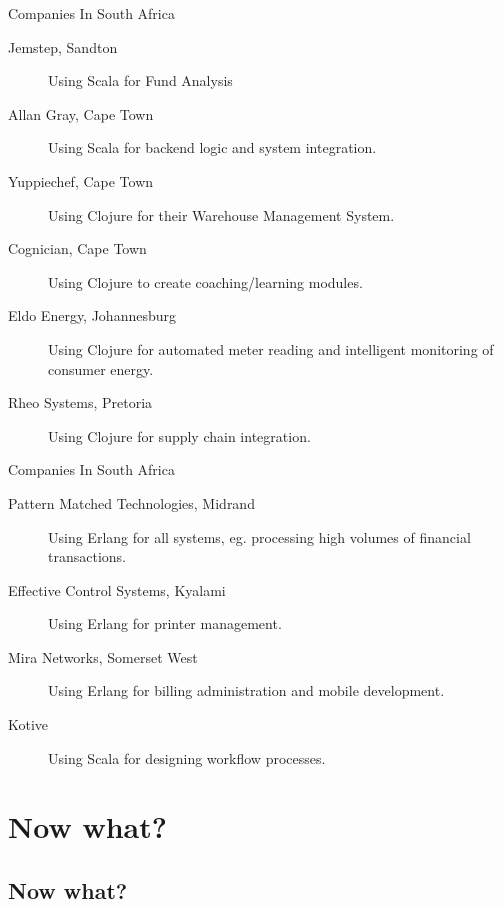 \documentclass[mathserif]{beamer}
\begin{document}
\begin{frame}{Companies In South Africa}

  \begin{description}
  \item[Jemstep, Sandton] Using Scala for Fund Analysis
  \item[Allan Gray, Cape Town] Using Scala for backend logic and system integration.
  \item[Yuppiechef, Cape Town] Using Clojure for their Warehouse
    Management System.
  \item[Cognician, Cape Town] Using Clojure to create coaching/learning modules.
  \item[Eldo Energy, Johannesburg] Using Clojure for automated meter
    reading and intelligent monitoring of consumer energy.
  \item[Rheo Systems, Pretoria] Using Clojure for supply chain integration.
  \end{description}

\end{frame}

\begin{frame}{Companies In South Africa}

  \begin{description}
  \item[Pattern Matched Technologies, Midrand] Using Erlang for all systems,
    eg. processing high volumes of financial transactions.
  \item[Effective Control Systems, Kyalami] Using Erlang for printer
    management.
  \item[Mira Networks, Somerset West] Using Erlang for billing
    administration and mobile development.
  \item[Kotive] Using Scala for designing workflow processes.
  \end{description}

\end{frame}

\section{Now what?}
\subsection{Now what?}
\end{document}
